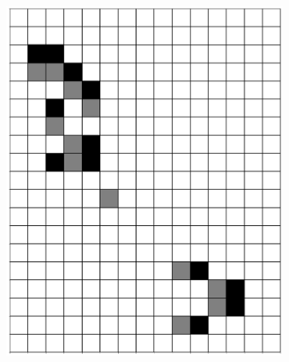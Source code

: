 \documentclass[12pt]{article}
\numberwithin{figure}{section} %
\begin{document}
\begin{figure}[H]
\begin{subfigure}{0.3\textwidth}
     		\subcaption{}
   	\end{subfigure}
     	\begin{subfigure}{0.3\textwidth}
     		\centering
     		\includegraphics[width=\linewidth]{Section4/29.7}
     		\subcaption{}
   	\end{subfigure}
        \begin{subfigure}{0.3\textwidth}
     		\centering

\end{subfigure}
\end{figure}
\end{document}
